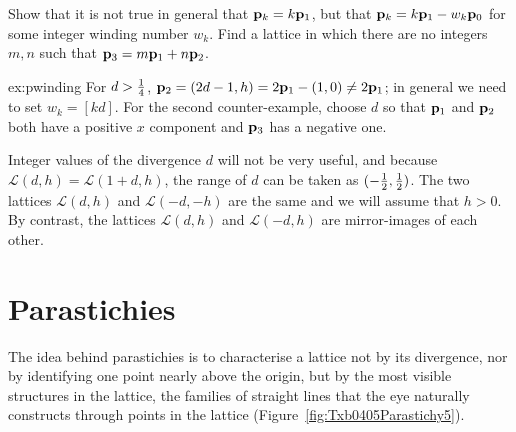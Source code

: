 \begin{jExercise}\label{ex:pwinding}
	Show that it is not true in general that ${\mathbf p}_{k}=k{\mathbf p}_{1}$, but that ${\mathbf p}_{k}=k{\mathbf p}_{1}-w_k{\mathbf p}_{0}$ for some integer winding number $w_k$. Find a lattice in which there are no integers $m,n$ such that ${\mathbf p}_{3}=m{\mathbf p}_{1}+n{\mathbf p}_{2}$. 
\end{jExercise}
\begin{jAnswer}{ex:pwinding}{
	For $d>\textstyle{\frac{1}{4}}$, ${\mathbf p}_{2}= (2d-1, h)=2{\mathbf p}_{1}-(1,0)\neq 2{\mathbf p}_{1}$;   in general we need to set $w_k= [ kd]$. For the second counter-example, choose $d$ so that ${\mathbf p}_{1}$ and ${\mathbf p}_{2}$ both have a positive $x$ component and ${\mathbf p}_{3}$ has a negative one.  
}
\end{jAnswer}		
%	
	
	
	Integer values of the divergence $d$ will not be very useful, and because   $\mathcal{L}(d,h)= \mathcal{L}(1+d,h)$, the range of $d$ can be taken as $(-\textstyle{\frac{1}{2}},\textstyle{\frac{1}{2}})$. The two lattices $\mathcal{L}(d,h)$ and $\mathcal{L}(-d,-h)$ are the same and we will assume that $h>0$. By contrast, the  lattices $\mathcal{L}(d,h)$ and $\mathcal{L}(-d,h)$ are mirror-images of each other.
		
\section{Parastichies}
\label{sec:parastichies}
The idea behind parastichies is to characterise a lattice not by its divergence, nor by identifying one point nearly above the origin, but by the most visible structures in the lattice, the families of straight lines that the eye naturally constructs through points in the lattice (Figure~\ref{fig:Txb0405Parastichy5}).



